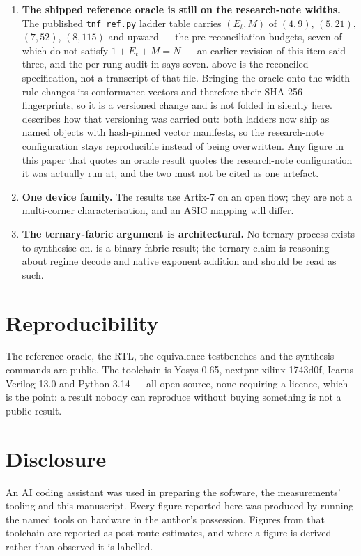 \begin{enumerate}[leftmargin=*]
\item \textbf{The shipped reference oracle is still on the research-note widths.}
The published \texttt{tnf\_ref.py} ladder table carries $(E_t,M)$ of
$(4,9)$, $(5,21)$, $(7,52)$, $(8,115)$ and upward --- the pre-reconciliation
budgets, seven of which do not satisfy $1+E_t+M=N$ --- an earlier revision of this
item said three, and the per-rung audit in  says
seven.  above is
the reconciled specification, not a transcript of that file. Bringing the oracle
onto the width rule changes its conformance vectors and therefore their SHA-256
fingerprints, so it is a versioned change and is not folded in silently here.
 describes how that versioning was carried out: both
ladders now ship as named objects with hash-pinned vector manifests, so the
research-note configuration stays reproducible instead of being overwritten. Any
figure in this paper that quotes an oracle result quotes the research-note
configuration it was actually run at, and the two must not be cited as one
artefact.

\item \textbf{One device family.} The results use Artix-7 on an open flow; they
are not a multi-corner characterisation, and an ASIC mapping will differ.

\item \textbf{The ternary-fabric argument is architectural.} No ternary process
exists to synthesise on.  is a binary-fabric result;
the ternary claim is reasoning about regime decode and native exponent addition
and should be read as such.
\end{enumerate}
\section*{Reproducibility}

The reference oracle, the RTL, the equivalence testbenches and the synthesis
commands are public. The toolchain is Yosys 0.65, nextpnr-xilinx 1743d0f,
Icarus Verilog 13.0 and Python 3.14 --- all open-source, none requiring a
licence, which is the point: a result nobody can reproduce without buying
something is not a public result.
\section*{Disclosure}

An AI coding assistant was used in preparing the software, the measurements'
tooling and this manuscript. Every figure reported here was produced by running
the named tools on hardware in the author's possession. Figures from that
toolchain are reported as post-route estimates, and where a figure is derived rather than observed it is
labelled.

